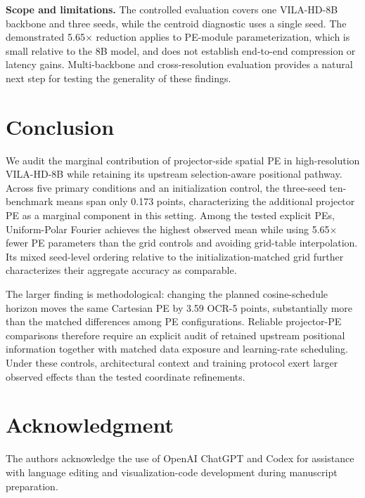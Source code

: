 \documentclass{article}
\begin{document}
\noindent\textbf{Scope and limitations.}
The controlled evaluation covers one VILA-HD-8B backbone and
three seeds, while the centroid diagnostic uses a single seed.
The demonstrated 5.65$\times$ reduction applies to PE-module
parameterization, which is small relative to the 8B model, and
does not establish end-to-end compression or latency gains.
Multi-backbone and cross-resolution evaluation provides
a natural next step for testing the generality of these findings.

\section{Conclusion}

We audit the marginal contribution of projector-side spatial PE
in high-resolution VILA-HD-8B while retaining its upstream
selection-aware positional pathway. Across five primary
conditions and an initialization control, the three-seed
ten-benchmark means span only 0.173 points, characterizing the
additional projector PE as a marginal component in this setting.
Among the tested explicit PEs, Uniform-Polar Fourier achieves
the highest observed mean while using 5.65$\times$ fewer PE
parameters than the grid controls and avoiding grid-table
interpolation. Its mixed seed-level ordering relative to the
initialization-matched grid further characterizes their aggregate
accuracy as comparable.

The larger finding is methodological: changing the planned
cosine-schedule horizon moves the same Cartesian PE by 3.59
OCR-5 points, substantially more than the matched differences
among PE configurations. Reliable projector-PE comparisons
therefore require an explicit audit of retained upstream
positional information together with matched data exposure and
learning-rate scheduling. Under these controls, architectural
context and training protocol exert larger observed effects than
the tested coordinate refinements.

\section*{Acknowledgment}
The authors acknowledge the use of OpenAI ChatGPT and Codex for assistance with language editing and visualization-code development during manuscript preparation.
\end{document}
